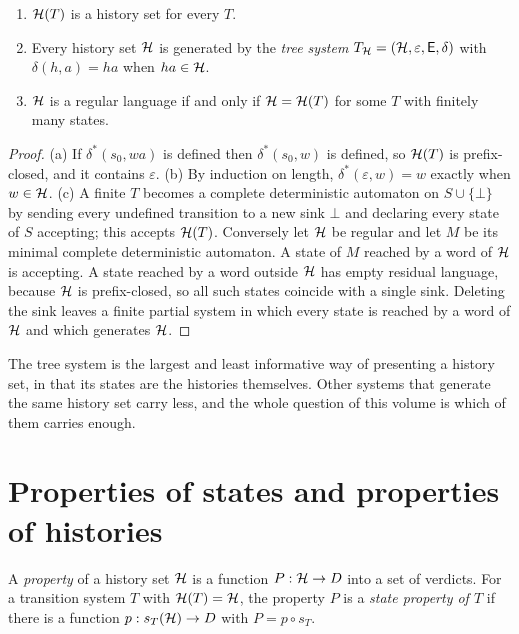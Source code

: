 \begin{established}\label{prop:lts}
\begin{enumerate}[nosep,label=(\alph*)]
  \item $\mathcal{H}(T)$ is a history set for every $T$.
  \item Every history set $\mathcal{H}$ is generated by the \emph{tree system} $T_{\mathcal{H}}=(\mathcal{H},\varepsilon,\mathsf{E},\delta)$ with $\delta(h,a)=ha$ when $ha\in\mathcal{H}$.
  \item $\mathcal{H}$ is a regular language if and only if $\mathcal{H}=\mathcal{H}(T)$ for some $T$ with finitely many states.
\end{enumerate}
\end{established}
\begin{proof}
(a) If $\delta^{*}(s_0,wa)$ is defined then $\delta^{*}(s_0,w)$ is defined, so $\mathcal{H}(T)$ is prefix-closed, and it contains $\varepsilon$. (b) By induction on length, $\delta^{*}(\varepsilon,w)=w$ exactly when $w\in\mathcal{H}$. (c) A finite $T$ becomes a complete deterministic automaton on $S\cup\{\bot\}$ by sending every undefined transition to a new sink $\bot$ and declaring every state of $S$ accepting; this accepts $\mathcal{H}(T)$. Conversely let $\mathcal{H}$ be regular and let $M$ be its minimal complete deterministic automaton. A state of $M$ reached by a word of $\mathcal{H}$ is accepting. A state reached by a word outside $\mathcal{H}$ has empty residual language, because $\mathcal{H}$ is prefix-closed, so all such states coincide with a single sink. Deleting the sink leaves a finite partial system in which every state is reached by a word of $\mathcal{H}$ and which generates $\mathcal{H}$.
\end{proof}

The tree system is the largest and least informative way of presenting a history set, in that its states are the histories themselves. Other systems that generate the same history set carry less, and the whole question of this volume is which of them carries enough.

\section{Properties of states and properties of histories}

\begin{definition}\label{def:state-property}
A \emph{property} of a history set $\mathcal{H}$ is a function $P:\mathcal{H}\to D$ into a set of verdicts. For a transition system $T$ with $\mathcal{H}(T)=\mathcal{H}$, the property $P$ is a \emph{state property of $T$} if there is a function $p:s_T(\mathcal{H})\to D$ with $P=p\circ s_T$.
\end{definition}

